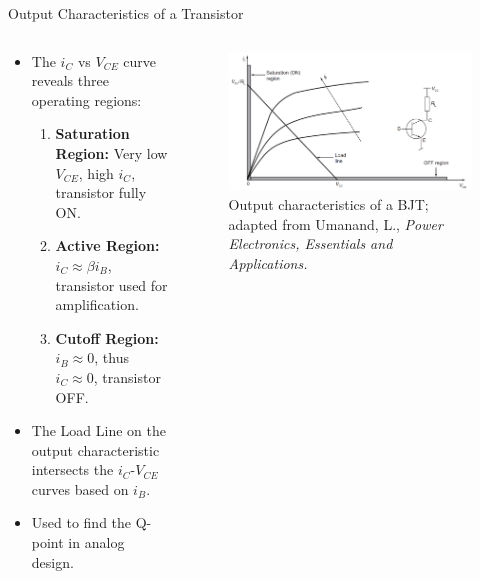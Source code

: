 \begin{frame}{Output Characteristics of a Transistor}
    \begin{columns}
    \begin{column}{0.55\textwidth}
    \begin{itemize}
        \item The $i_C$ vs $V_{CE}$ curve reveals three operating regions:
        \begin{enumerate}
            \item \textbf{Saturation Region:} Very low $V_{CE}$, high $i_C$, transistor fully ON.
            \item \textbf{Active Region:} $i_C \approx \beta i_B$, transistor used for amplification.
            \item \textbf{Cutoff Region:} $i_B \approx 0$, thus $i_C \approx 0$, transistor OFF.
        \end{enumerate}
        \item The Load Line on the output characteristic intersects the $i_C$-$V_{CE}$ curves based on $i_B$.
        \item Used to find the Q-point in analog design.
    \end{itemize}
    \end{column}

    \begin{column}{0.45\textwidth}
        \begin{figure}
        \centering
        \includegraphics[width=1\textwidth]{fig/lec04/BJT_VI_Characteristics.png}
        \caption{Output characteristics of a BJT; adapted from Umanand, L., \textit{Power Electronics, Essentials and Applications.}}
    \end{figure}
    \end{column}
\end{columns}
\end{frame}



